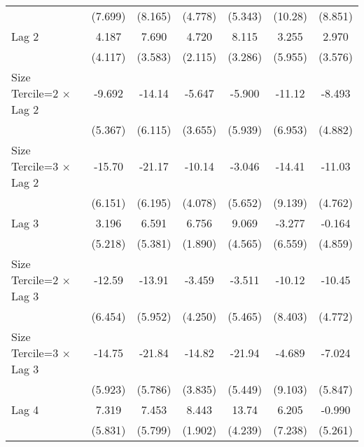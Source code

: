 \begin{table}[htbp]
\begin{tabular}{l*{6}{c}}
                &  (7.699)         &  (8.165)         &  (4.778)         &  (5.343)         &  (10.28)         &  (8.851)         \\
\addlinespace
Lag 2           &    4.187         &    7.690\sym{*}  &    4.720\sym{*}  &    8.115\sym{*}  &    3.255         &    2.970         \\
                &  (4.117)         &  (3.583)         &  (2.115)         &  (3.286)         &  (5.955)         &  (3.576)         \\
\addlinespace
Size Tercile=2 $\times$ Lag 2&   -9.692         &   -14.14\sym{*}  &   -5.647         &   -5.900         &   -11.12         &   -8.493         \\
                &  (5.367)         &  (6.115)         &  (3.655)         &  (5.939)         &  (6.953)         &  (4.882)         \\
\addlinespace
Size Tercile=3 $\times$ Lag 2&   -15.70\sym{*}  &   -21.17\sym{***}&   -10.14\sym{*}  &   -3.046         &   -14.41         &   -11.03\sym{*}  \\
                &  (6.151)         &  (6.195)         &  (4.078)         &  (5.652)         &  (9.139)         &  (4.762)         \\
\addlinespace
Lag 3           &    3.196         &    6.591         &    6.756\sym{***}&    9.069\sym{*}  &   -3.277         &   -0.164         \\
                &  (5.218)         &  (5.381)         &  (1.890)         &  (4.565)         &  (6.559)         &  (4.859)         \\
\addlinespace
Size Tercile=2 $\times$ Lag 3&   -12.59         &   -13.91\sym{*}  &   -3.459         &   -3.511         &   -10.12         &   -10.45\sym{*}  \\
                &  (6.454)         &  (5.952)         &  (4.250)         &  (5.465)         &  (8.403)         &  (4.772)         \\
\addlinespace
Size Tercile=3 $\times$ Lag 3&   -14.75\sym{*}  &   -21.84\sym{***}&   -14.82\sym{***}&   -21.94\sym{***}&   -4.689         &   -7.024         \\
                &  (5.923)         &  (5.786)         &  (3.835)         &  (5.449)         &  (9.103)         &  (5.847)         \\
\addlinespace
Lag 4           &    7.319         &    7.453         &    8.443\sym{***}&    13.74\sym{**} &    6.205         &   -0.990         \\
                &  (5.831)         &  (5.799)         &  (1.902)         &  (4.239)         &  (7.238)         &  (5.261)         \\

\end{tabular}
\end{table}
